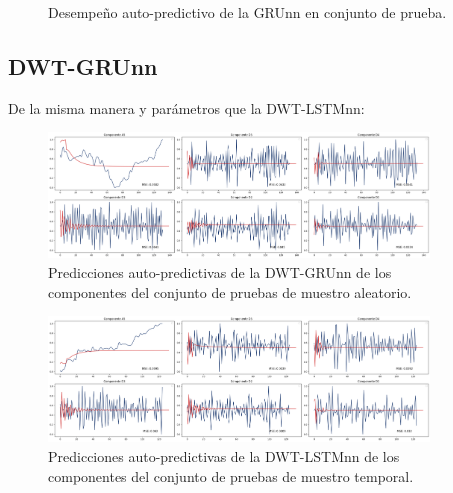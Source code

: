 \begin{figure}[H]
\begin{minipage}{0.5\textwidth}
    \end{minipage}
    \caption{Desempeño auto-predictivo de la GRUnn en conjunto de prueba.} 
    \label{fig:c_prueba_GRU_autopred}
\end{figure}


\subsection{DWT-GRUnn}

De la misma manera y parámetros que la DWT-LSTMnn:

\begin{figure}[H]
    \centering
    \includegraphics[width=0.9\textwidth]{Figuras/proceso_de_entrenamiento/grafs_c_prueba/muestreo_aleatorio/DWT_GRU/auto_predictiva/DWT_GRU.png}
    \caption{Predicciones auto-predictivas de la DWT-GRUnn de los componentes del conjunto de pruebas de muestro aleatorio.} 
    \label{fig:c_prueba_componentes_DWTGRU_autopred_muestreo_aleatorio}
\end{figure}

\begin{figure}[H]
    \centering
    \includegraphics[width=0.9\textwidth]{Figuras/proceso_de_entrenamiento/grafs_c_prueba/DWT_GRU/auto_predictiva/DWT_GRU.png}
    \caption{Predicciones auto-predictivas de la DWT-LSTMnn de los componentes del conjunto de pruebas de muestro temporal.} 
    \label{fig:c_prueba_componentes_DWTGRU_autopred}
\end{figure}


